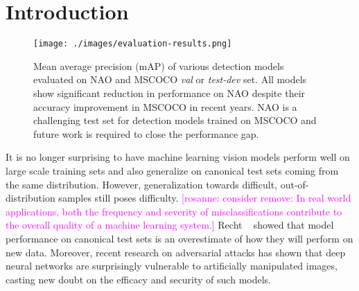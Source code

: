 \documentclass[final]{cvpr}
\newcommand{\comments}[1]{#1}
\newcommand{\comments}[1]{}
\newcommand{\rosanne}[1]{\comments{\textcolor{magenta}{[rosanne: #1]}}}
\begin{document}
\section{Introduction}

\begin{figure}[t]
\begin{center}
   \texttt{[image: ./images/evaluation-results.png]}
\end{center}
   \caption{Mean average precision (mAP) of various detection models evaluated on NAO and MSCOCO \textit{val} or \textit{test-dev} set. All models show significant reduction in performance on NAO despite their accuracy improvement in MSCOCO in recent years. NAO is a challenging test set for detection models trained on MSCOCO and future work is required to close the performance gap.}
\label{fig:long}
\label{fig:onecol}
\label{fig:evaluation_results}
\end{figure}

It is no longer surprising to have machine learning vision models perform well on large scale training sets and also generalize on canonical test sets coming from the same distribution. However, generalization towards difficult, out-of-distribution samples still poses difficulty. \rosanne{consider remove: In real world applications, both the frequency and severity of misclassifications contribute to the overall quality of a machine learning system.} Recht \etal~\cite{Recht2019-pm} showed that model performance on canonical test sets is an overestimate of how they will perform on new data. Moreover, recent research on adversarial attacks has shown that deep neural networks are surprisingly vulnerable to artificially manipulated images, casting new doubt on the efficacy and security of such models.
 
\end{document}
